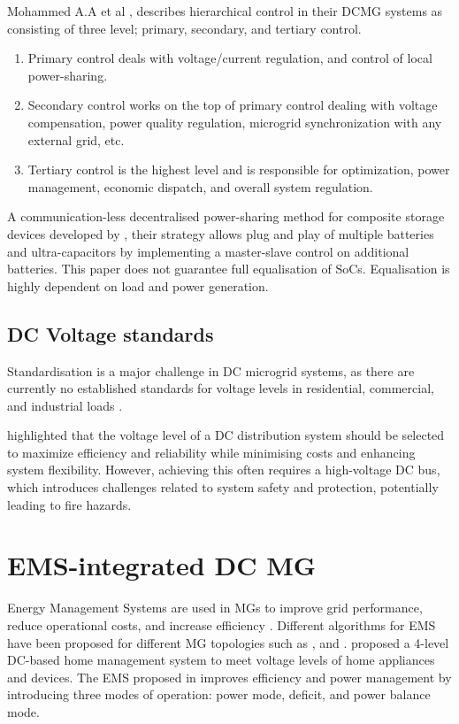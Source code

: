 Mohammed A.A et al \cite{Mohamed2001}, describes hierarchical control in their DCMG systems as consisting of three level; primary, secondary, and tertiary control.
\begin{enumerate}[nolistsep]
	\item Primary control deals with voltage/current regulation, and control of local power-sharing.
	\item Secondary control works on the top of primary control dealing with voltage compensation, power quality regulation, microgrid synchronization with any external grid, etc.
	\item Tertiary control is the highest level and is responsible for optimization, power management, economic dispatch, and overall system regulation.
\end{enumerate}
A communication-less decentralised power-sharing method for composite storage devices developed by \cite{Bastos2022}, their strategy allows plug and play of multiple batteries and ultra-capacitors by implementing a master-slave control on additional batteries. This paper does not guarantee full equalisation of SoCs. Equalisation is highly dependent on load and power generation. \par

\subsection{DC Voltage standards}
Standardisation is a major challenge in DC microgrid systems, as there are currently no established standards for voltage levels in residential, commercial, and industrial loads \cite{Tapan2018}.\par
\cite{Prabhala2018} highlighted that the voltage level of a DC distribution system should be selected to maximize efficiency and reliability while minimising costs and enhancing system flexibility. However, achieving this often requires a high-voltage DC bus, which introduces challenges related to system safety and protection, potentially leading to fire hazards.
\section{EMS-integrated DC MG}
Energy Management Systems are used in MGs to improve grid performance, reduce operational costs, and increase efficiency \cite{Beus2020}. Different algorithms for EMS have been proposed for different MG topologies such as \cite{Burmester2017}, \cite{Surya2016} and \cite{Andreadis2018}. \cite{Yuto2016} proposed a 4-level DC-based home management system to meet voltage levels of home appliances and devices. The EMS proposed in \cite{Durga2020} improves efficiency and power management by introducing three modes of operation: power mode, deficit, and power balance mode.

